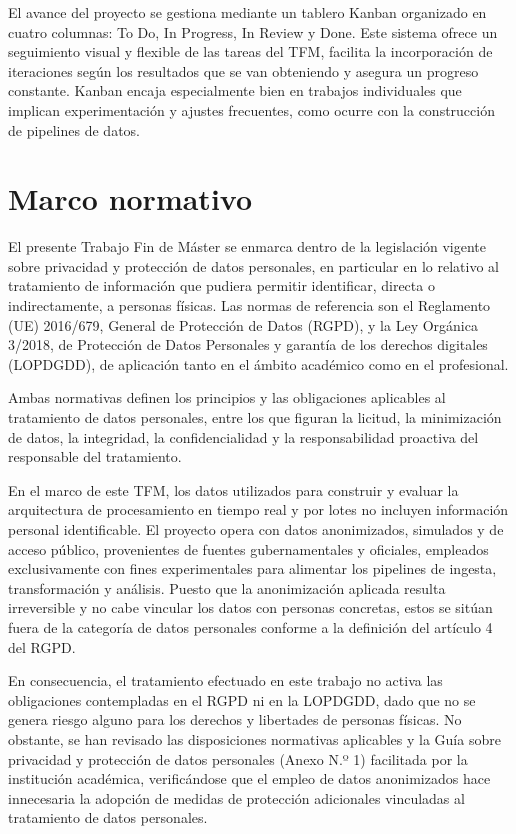 \documentclass[12pt,a4paper]{article}
\begin{document}
El avance del proyecto se gestiona mediante un tablero Kanban organizado en cuatro columnas: To Do, In Progress, In Review y Done. Este sistema ofrece un seguimiento visual y flexible de las tareas del TFM, facilita la incorporación de iteraciones según los resultados que se van obteniendo y asegura un progreso constante. Kanban encaja especialmente bien en trabajos individuales que implican experimentación y ajustes frecuentes, como ocurre con la construcción de pipelines de datos.

\clearpage
\section{Marco normativo}\label{marco-normativo}

El presente Trabajo Fin de Máster se enmarca dentro de la legislación vigente sobre privacidad y protección de datos personales, en particular en lo relativo al tratamiento de información que pudiera permitir identificar, directa o indirectamente, a personas físicas. Las normas de referencia son el Reglamento (UE) 2016/679, General de Protección de Datos (RGPD), y la Ley Orgánica 3/2018, de Protección de Datos Personales y garantía de los derechos digitales (LOPDGDD), de aplicación tanto en el ámbito académico como en el profesional.

Ambas normativas definen los principios y las obligaciones aplicables al tratamiento de datos personales, entre los que figuran la licitud, la minimización de datos, la integridad, la confidencialidad y la responsabilidad proactiva del responsable del tratamiento.

En el marco de este TFM, los datos utilizados para construir y evaluar la arquitectura de procesamiento en tiempo real y por lotes no incluyen información personal identificable. El proyecto opera con datos anonimizados, simulados y de acceso público, provenientes de fuentes gubernamentales y oficiales, empleados exclusivamente con fines experimentales para alimentar los pipelines de ingesta, transformación y análisis. Puesto que la anonimización aplicada resulta irreversible y no cabe vincular los datos con personas concretas, estos se sitúan fuera de la categoría de datos personales conforme a la definición del artículo 4 del RGPD.

En consecuencia, el tratamiento efectuado en este trabajo no activa las obligaciones contempladas en el RGPD ni en la LOPDGDD, dado que no se genera riesgo alguno para los derechos y libertades de personas físicas. No obstante, se han revisado las disposiciones normativas aplicables y la Guía sobre privacidad y protección de datos personales (Anexo N.º 1) facilitada por la institución académica, verificándose que el empleo de datos anonimizados hace innecesaria la adopción de medidas de protección adicionales vinculadas al tratamiento de datos personales.
\end{document}
